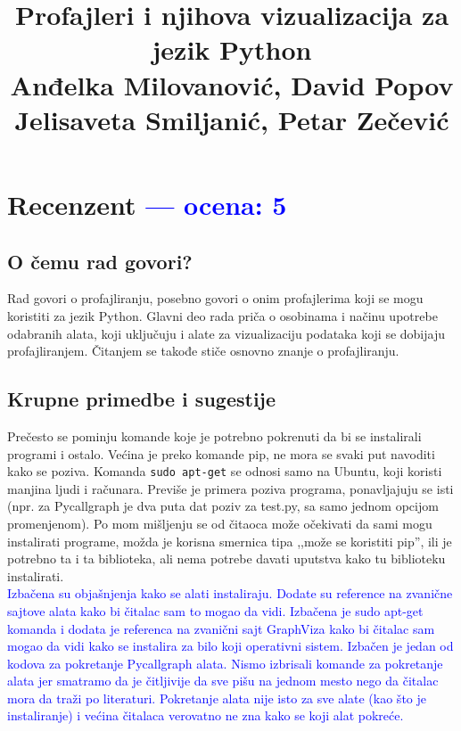 \documentclass[a4paper]{report}
\newcommand{\odgovor}[1]{\textcolor{blue}{#1}}
\begin{document}
\title{Profajleri i njihova vizualizacija za jezik Python\\ \small{Anđelka Milovanović, David Popov \\
Jelisaveta Smiljanić, Petar Zečević \\}}

\maketitle

\tableofcontents

\chapter{Recenzent \odgovor{--- ocena: 5} }

\section{O čemu rad govori?}
Rad govori o profajliranju, posebno govori o onim profajlerima koji se mogu koristiti za jezik Python. Glavni deo rada priča o osobinama i načinu upotrebe odabranih alata, koji uključuju i alate za vizualizaciju podataka koji se dobijaju profajliranjem. Čitanjem se takođe stiče osnovno znanje o profajliranju.
\section{Krupne primedbe i sugestije}
Prečesto se pominju komande koje je potrebno pokrenuti da bi se instalirali programi i ostalo. Većina je preko komande pip, ne mora se svaki put navoditi kako se poziva. Komanda \verb|sudo apt-get| se odnosi samo na Ubuntu, koji koristi manjina ljudi i računara. Previše je primera poziva programa, ponavljajuju se isti (npr. za Pycallgraph je dva puta dat poziv za test.py, sa samo jednom opcijom promenjenom). Po mom mišljenju se od čitaoca može očekivati da sami mogu instalirati programe, možda je korisna smernica tipa ,,može se koristiti pip'', ili je potrebno ta i ta biblioteka, ali nema potrebe davati uputstva kako tu biblioteku instalirati.\\
\odgovor{Izbačena su objašnjenja kako se alati instaliraju. Dodate su reference na zvanične sajtove alata kako bi čitalac sam to mogao da vidi. Izbačena je sudo apt-get komanda i dodata je referenca na zvanični sajt GraphViza kako bi čitalac sam mogao da vidi kako se instalira za bilo koji operativni sistem. Izbačen je jedan od kodova za pokretanje Pycallgraph alata. Nismo izbrisali komande za pokretanje alata jer smatramo da je čitljivije da sve pišu na jednom mesto nego da čitalac mora da traži po literaturi. Pokretanje alata nije isto za sve alate (kao što je instaliranje) i većina čitalaca verovatno ne zna kako se koji alat pokreće.}
\end{document}
